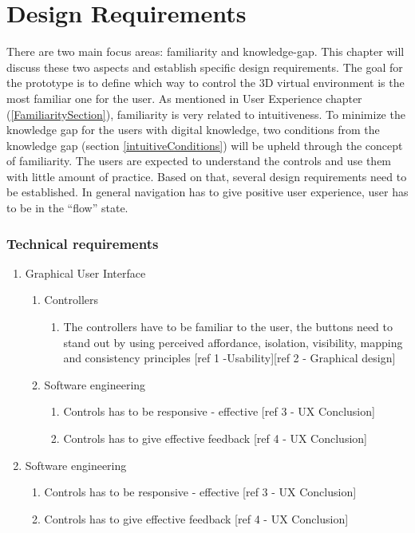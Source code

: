 \section{Design Requirements}\label{DesignRequirements}
There are two main focus areas: familiarity and knowledge-gap. This chapter will discuss these two aspects and establish specific design requirements. 
The goal for the prototype is to define which way to control the 3D virtual environment is the most familiar one for the user. As mentioned in User Experience chapter (\ref{FamiliaritySection}), familiarity is very related to intuitiveness.
To minimize the knowledge gap for the users with digital knowledge, two conditions from the knowledge gap (section \ref{intuitiveConditions}) will be upheld through the concept of familiarity. The users are expected to understand the controls and use them with little amount of practice. Based on that, several design requirements need to be established. In general navigation has to give  positive user experience, user has to be in the “flow” state. 

\subsubsection{Technical requirements}
\begin{enumerate}
	\item Graphical User Interface
		\begin{enumerate}
		\item Controllers
			\begin{enumerate}
				\item The controllers have to be familiar to the user, 						the buttons need to stand out by using perceived 							affordance, isolation, visibility, mapping and 								consistency principles [ref 1 -Usability][ref 2 - 							Graphical design]
			\end{enumerate}
		\item Software engineering
			\begin{enumerate}
				\item Controls has to be responsive - effective [ref 3 - 					UX Conclusion]
				\item Controls has to give effective feedback [ref 4 - UX 					Conclusion]
			\end{enumerate}
		\end{enumerate}
	\item Software engineering
		\begin{enumerate}
			\item Controls has to be responsive - effective [ref 3 - UX 				Conclusion]
			\item Controls has to give effective feedback [ref 4 - UX 					Conclusion]
		\end{enumerate}	
\end{enumerate}
